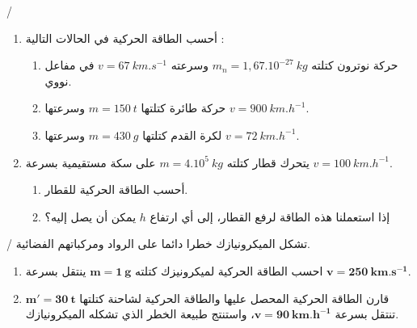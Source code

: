 \documentclass[12pt,a4paper]{article}
\author{نايت الياس}
\begin{document}
  
					\begin{exercice}{}/
	\begin{enumerate}
	\item 
أحسب الطاقة الحركیة في الحالات التالیة :
	\begin{enumerate}
	\item حركة نوترون كتلته
	$m_n = 1,67.10^{-27}\ kg$
	وسرعته
	$v = 67\ km.s^{-1}$
	في مفاعل نووي.
	\item حركة طائرة كتلتھا
	$m = 150\ t$
	وسرعتھا
$v = 900\ km.h^{-1}$.
\item لكرة القدم كتلتها 
$m = 430\ g$
وسرعتها 
$v=72\ km.h^{-1}$.
\end{enumerate}
\item يتحرك قطار كتلته 
$m=4.10^{5}\ kg$
على سكة مستقيمية بسرعة 
$v = 100\ km.h^{-1}$.
\begin{enumerate}
\item أحسب الطاقة الحركية للقطار.
\item إذا استعملنا هذه الطاقة لرفع القطار، إلى أي ارتفاع 
$h$
يمكن أن يصل إليه؟
\end{enumerate}
\end{enumerate}
	\end{exercice}%
					\begin{exercice}{}/
					تشكل الميكرونيازك خطرا دائما على الرواد ومركباتهم الفضائية.
\begin{enumerate}
\item احسب الطاقة الحركية لميكرونيزك كتلته 
$\bm{m=1\ g}$
ينتقل بسرعة
$\bm{v=250\ km.s^{-1}}$.
\item قارن الطاقة الحركية المحصل عليها والطاقة الحركية 
لشاحنة كتلتها 
$\bm{m'=30\ t}$
تنتقل بسرعة
$\bm{v=90\ km.h^{-1}}$، واستنتج طبيعة الخطر الذي
تشكله الميكرونيازك. 
					\end{enumerate}
					\end{exercice}%
\end{document}
